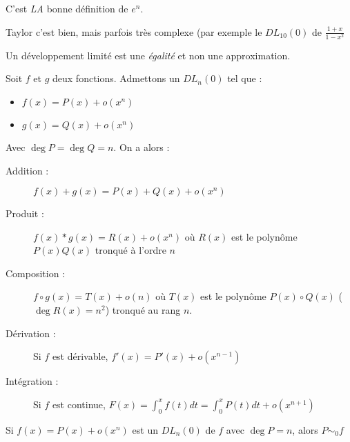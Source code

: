 \rem
C'est \emph{LA} bonne définition de $e^n$.

\expl

\rem
Taylor c'est bien, mais parfois très complexe (par exemple le $DL_{10}(0)$ de $\frac{1+x}{1-x^2}$

\rem
Un développement limité est une \emph{égalité} et non une approximation.

Soit $f$ et $g$ deux fonctions. Admettons un $DL_n(0)$ tel que :
\begin{itemize}
	\item $f(x)=P(x)+o(x^n)$
	\item $g(x)=Q(x)+o(x^n)$
\end{itemize}
Avec $\deg P =\deg Q=n$. On a alors :
\begin{description}
	\item[Addition :]$f(x) + g(x) = P(x) + Q(x) + o(x^n)$
	\item[Produit :]$f(x) * g(x) = R(x) + o(x^n)$ où $R(x)$ est le polynôme $P(x)Q(x)$ tronqué à l'ordre $n$
	\item[Composition :]$f\circ g(x) = T(x) + o(n)$ où $T(x)$ est le polynôme $P(x)\circ Q(x)$ ($\deg R(x) = n^2$) tronqué au rang $n$.
	\item[Dérivation :] Si $f$ est dérivable, $f'(x) = P'(x) + o(x^{n-1})$
	\item[Intégration :]Si $f$ est continue, $F(x) = \int_0^x{f(t) dt} =\int_0^x{P(t)dt}+o(x^{n+1})$
\end{description}

\prop{}
Si $f(x) = P(x)+o(x^n)$ est un $DL_n(0)$ de $f$ avec $\deg P=n$, alors $P \sim_0 f$
